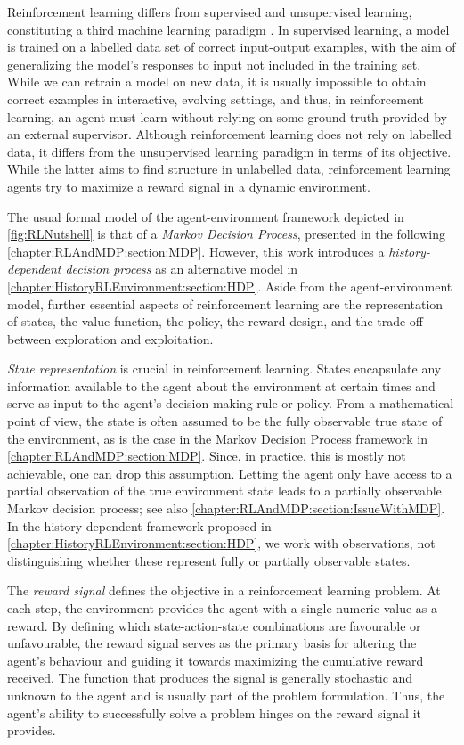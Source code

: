 \documentclass[
    a4paper,
    11pt,
    bibliography=totoc,
    listof=totoc,      
    headinclude=true,
    cleardoublepage=empty,
]{scrbook}
\theoremstyle{plain}
\theoremstyle{definition}
\theoremstyle{remark}
\begin{document}
Reinforcement learning differs from supervised and unsupervised learning, 
constituting a third machine learning paradigm \cite[Section~1.1]%
{sutton2018_rli}. In supervised learning, a model is trained on a labelled
data set of correct input-output examples, with the aim of generalizing the 
model's responses to input not included in the training set. While we can 
retrain a model on new data, it is usually impossible to obtain correct 
examples in interactive, evolving settings, and thus, in reinforcement 
learning, an agent must learn without relying on some ground truth provided by 
an external supervisor. Although reinforcement learning does not rely on 
labelled data, it differs from the unsupervised learning paradigm in terms of 
its objective. While the latter aims to find structure in unlabelled data, 
reinforcement learning agents try to maximize a reward signal in a dynamic 
environment.

The usual formal model of the agent-environment framework depicted in
\cref{fig:RLNutshell} is that of a \textit{Markov Decision Process},  
presented in the following \cref{chapter:RLAndMDP:section:MDP}. However, this 
work introduces a \textit{history-dependent decision process} as an 
alternative model in \cref{chapter:HistoryRLEnvironment:section:HDP}. Aside 
from the agent-environment model, further essential aspects of reinforcement 
learning are the representation of states, the value function, the policy, the 
reward design, and the trade-off between exploration and exploitation.

\textit{State representation} is crucial in reinforcement learning. States 
encapsulate any information available to the agent about the environment at 
certain times and serve as input to the agent's decision-making rule or 
policy. From a mathematical point of view, the state is often assumed to be 
the fully observable true state of the environment, as is the case in the 
Markov Decision Process framework in \cref{chapter:RLAndMDP:section:MDP}. 
Since, in practice, this is mostly not achievable, one can drop this 
assumption. Letting the agent only have access to a partial observation of the 
true environment state leads to a partially observable Markov decision 
process; see also \cref{chapter:RLAndMDP:section:IssueWithMDP}. In the 
history-dependent framework proposed in 
\cref{chapter:HistoryRLEnvironment:section:HDP}, we work with observations, 
not distinguishing whether these represent fully or partially observable 
states.
 
The \textit{reward signal} defines the objective in a reinforcement learning 
problem. At each step, the environment provides the agent with a single 
numeric value as a reward. By defining which state-action-state combinations 
are favourable or unfavourable, the reward signal serves as the primary basis 
for altering the agent's behaviour and guiding it towards maximizing the 
cumulative reward received. The function that produces the signal is generally 
stochastic and unknown to the agent and is usually part of the problem 
formulation. Thus, the agent's ability to successfully solve a problem hinges 
on the reward signal it provides.
\end{document}
